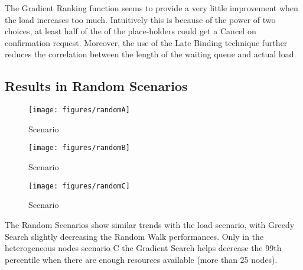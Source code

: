 \documentclass[conference]{IEEEtran}
\begin{document}
  The Gradient Ranking function seems to provide a very little improvement
  when the load increases too much. Intuitively this is because of the power
  of two choices, at least half of the of the place-holders could get a
  Cancel on confirmation request. Moreover, the use of the Late Binding
  technique further reduces the correlation between the length of the
  waiting queue and actual load.

\subsection{Results in Random Scenarios}

  \begin{figure}
  \begin{center}
  \texttt{[image: figures/randomA]}
  \caption{Scenario }
  \label{fig:comparison}
  \end{center}
  \end{figure}

  \begin{figure}
  \begin{center}
  \texttt{[image: figures/randomB]}
  \caption{Scenario }
  \label{fig:comparison}
  \end{center}
  \end{figure}

  \begin{figure}
  \begin{center}
  \texttt{[image: figures/randomC]}
  \caption{Scenario }
  \label{fig:comparison}
  \end{center}
  \end{figure}


  The Random Scenarios show similar trends with the load scenario, with
  Greedy Search slightly decreasing the Random Walk performances. Only in
  the heterogeneous nodes scenario C the Gradient Search helps decrease
  the 99th percentile when there are enough resources available (more than
  25 nodes).
 
\end{document}
